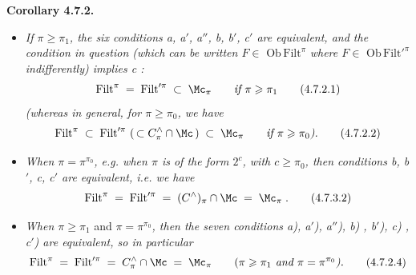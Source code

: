 \textbf{Corollary 4.7.2.}
\begin{itemize}[leftmargin=4em]
\item[\textit{1°)}] \textit{If $\pi \geqslant \pi_1$, the six conditions a, a$'$, a$''$, b, b$'$, c$'$ are equivalent, and the condition in question (which can be written $F \in$} $\mathrm{Ob}\,\mathrm{Filt}^{\pi}$ \textit{where $F \in$} $\mathrm{Ob}\,\mathrm{Filt}'^{\pi}$ \textit{indifferently) implies c :} %
\[
\mathrm{Filt}^{\pi} \;=\; \mathrm{Filt}'^{\pi} \;\subset\; \Mc_{\pi} \qquad \textit{if } \pi \geqslant \pi_1 \tag*{(4.7.2.1)}
\]
\textit{(whereas in general, for $\pi \geqslant \pi_0$, we have}
\[
\mathrm{Filt}^{\pi} \;\subset\; \mathrm{Filt}'^{\pi}\ (\,\subset C^{\wedge}_{\pi} \cap \Mc\,) \;\subset\; \Mc_{\pi} \qquad \textit{if } \pi \geqslant \pi_0\textit{).} \tag*{(4.7.2.2)}
\]
\item[\textit{2°)}] \textit{When $\pi = \pi^{\pi_0}$, e.g. when $\pi$ is of the form $2^{c}$, with $c \geqslant \pi_0$, then conditions b, b$'$, c, c$'$ are equivalent, i.e. we have}
\[
\mathrm{Filt}^{\pi} \;=\; \mathrm{Filt}'^{\pi} \;=\; (C^{\wedge})_{\pi} \cap \Mc \;=\; \Mc_{\pi}\;. \tag*{(4.7.3.2)} %
\]
\item[\textit{3°)}] \textit{When $\pi \geqslant \pi_1$} and \textit{$\pi = \pi^{\pi_0}$, then the seven conditions a), a$'$), a$''$), b) , b$'$), c) , c$'$) are equivalent, so in particular}
\[
\mathrm{Filt}^{\pi} \;=\; \mathrm{Filt}'^{\pi} \;=\; C^{\wedge}_{\pi} \cap \Mc \;=\; \Mc_{\pi} \qquad (\pi \geqslant \pi_1 \textit{ and } \pi = \pi^{\pi_0}\textit{).} \tag*{(4.7.2.4)}
\]
\end{itemize}